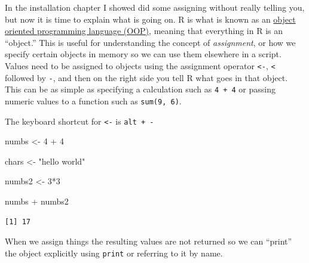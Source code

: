 \documentclass[
  letterpaper,
  DIV=11,
  numbers=noendperiod,
  oneside]{scrreprt}
\newenvironment{Shaded}{\begin{snugshade}}{\end{snugshade}}
\newcommand{\DecValTok}[1]{\textcolor[rgb]{0.68,0.00,0.00}{#1}}
\newcommand{\NormalTok}[1]{\textcolor[rgb]{0.00,0.23,0.31}{#1}}
\newcommand{\OtherTok}[1]{\textcolor[rgb]{0.00,0.23,0.31}{#1}}
\newcommand{\SpecialCharTok}[1]{\textcolor[rgb]{0.37,0.37,0.37}{#1}}
\newcommand{\StringTok}[1]{\textcolor[rgb]{0.13,0.47,0.30}{#1}}
\begin{document}
In the installation chapter I showed did some assigning without really
telling you, but now it is time to explain what is going on. R is what
is known as an
\href{https://en.wikipedia.org/wiki/Object-oriented_programming}{object
oriented programming language (OOP)}, meaning that everything in R is an
``object.'' This is useful for understanding the concept of
\emph{assignment}, or how we specify certain objects in memory so we can
use them elsewhere in a script. Values need to be assigned to objects
using the assignment operator \texttt{\textless{}-},
\texttt{\textless{}} followed by \texttt{-}, and then on the right side
you tell R what goes in that object. This can be as simple as specifying
a calculation such as \texttt{4\ +\ 4} or passing numeric values to a
function such as \texttt{sum(9,\ 6)}.

\begin{tcolorbox}[enhanced jigsaw, breakable, opacitybacktitle=0.6, colframe=quarto-callout-tip-color-frame, bottomrule=.15mm, opacityback=0, toprule=.15mm, coltitle=black, toptitle=1mm, colback=white, titlerule=0mm, bottomtitle=1mm, colbacktitle=quarto-callout-tip-color!10!white, title=\textcolor{quarto-callout-tip-color}{\faLightbulb}\hspace{0.5em}{Tip}, rightrule=.15mm, arc=.35mm, leftrule=.75mm, left=2mm]

The keyboard shortcut for \texttt{\textless{}-} is \texttt{alt\ +\ -}

\end{tcolorbox}

\begin{Shaded}
\begin{Highlighting}[]
\NormalTok{numbs }\OtherTok{\textless{}{-}} \DecValTok{4} \SpecialCharTok{+} \DecValTok{4} 

\NormalTok{chars }\OtherTok{\textless{}{-}} \StringTok{"hello world"}

\NormalTok{numbs2 }\OtherTok{\textless{}{-}} \DecValTok{3}\SpecialCharTok{*}\DecValTok{3}

\NormalTok{numbs }\SpecialCharTok{+}\NormalTok{ numbs2}
\end{Highlighting}
\end{Shaded}

\begin{verbatim}
[1] 17
\end{verbatim}

When we assign things the resulting values are not returned so we can
``print'' the object explicitly using \texttt{print} or referring to it
by name.
\end{document}
